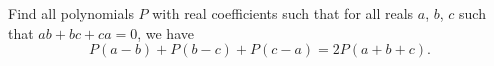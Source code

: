 Find all polynomials $P$ with real coefficients such that
for all reals $a$, $b$, $c$ such that $ab+bc+ca = 0$, we have
\[ P(a-b) + P(b-c) + P(c-a) = 2P(a+b+c). \]